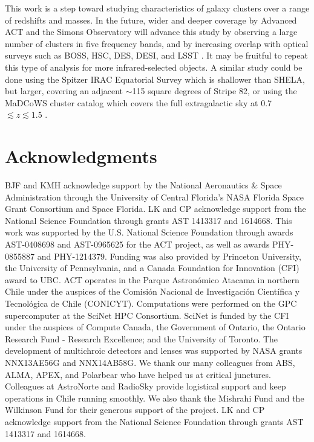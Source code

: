 \documentclass[a4paper,fleqn,usenatbib]{mnras}
\begin{document}
This work is a step toward studying characteristics of galaxy clusters over a range of redshifts and masses. 
In the future, wider and deeper coverage by Advanced ACT and the Simons Observatory will advance this study by observing a large number of clusters in five frequency bands, and by increasing overlap with optical surveys such as BOSS, HSC, DES, DESI, and LSST \citep{2016SPIE.9910E..14D}. 
It may be fruitful to repeat this type of analysis for more infrared-selected objects. A similar study could be done using the Spitzer IRAC Equatorial Survey \citep[SpIES,][]{2016ApJS..225....1T} which is shallower than SHELA, but larger, covering an adjacent $\sim$115 square degrees of Stripe 82, or using the MaDCoWS cluster catalog which covers the full extragalactic sky at 0.7 $\lesssim z \lesssim 1.5$ \citep{2018arXiv180906820G}.

\section*{Acknowledgments}
BJF and KMH acknowledge support by the National Aeronautics \& Space Administration through the University of Central Florida's NASA Florida Space Grant Consortium and Space Florida. LK and CP acknowledge support from the National Science Foundation through grants AST 1413317 and 1614668. This work was supported by the U.S. National Science Foundation through awards AST-0408698 and AST-0965625 for the ACT project, as well as awards PHY-0855887 and PHY-1214379. Funding was also provided by Princeton University, the University of Pennsylvania, and a Canada Foundation for Innovation (CFI) award to UBC. ACT operates in the Parque Astron\'omico Atacama in northern Chile under the auspices of the Comisi\'on Nacional de Investigaci\'on Cient\'ifica y Tecnol\'ogica de Chile (CONICYT). Computations were performed on the GPC supercomputer at the SciNet HPC Consortium. SciNet is funded by the CFI under the auspices of Compute Canada, the Government of Ontario, the Ontario Research Fund - Research Excellence; and the University of Toronto. The development of multichroic detectors and lenses was supported by NASA grants NNX13AE56G and NNX14AB58G. We thank our many colleagues from ABS, ALMA, APEX, and Polarbear who have helped us at critical junctures. Colleagues at AstroNorte and RadioSky provide logistical support and keep operations in Chile running smoothly. We also thank the Mishrahi Fund and the Wilkinson Fund for their generous support of the project. %
LK and CP acknowledge support from the National Science Foundation through grants AST 1413317 and 1614668.





 




\bsp	%
\label{lastpage}
\end{document}
